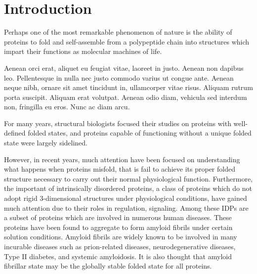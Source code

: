 \chapter{Introduction}

% 

Perhaps one of the most remarkable phenomenon of nature is the ability of proteins to fold and self-assemble from a polypeptide chain into structures which impart their functions as molecular machines of life.


Aenean orci erat, aliquet eu feugiat vitae, laoreet in justo. Aenean non dapibus leo. Pellentesque in nulla nec justo commodo varius ut congue ante. Aenean neque nibh, ornare sit amet tincidunt in, ullamcorper vitae risus. Aliquam rutrum porta suscipit. Aliquam erat volutpat. Aenean odio diam, vehicula sed interdum non, fringilla eu eros. Nunc ac diam arcu.


For many years, structural biologists focused their studies on proteins with well-defined folded states, and proteins capable of functioning without a unique folded state were largely sidelined.

However, in recent years, much attention have been focused on understanding what happens when proteins misfold, that is fail to achieve its proper folded structure necessary to carry out their normal physiological function.  Furthermore, the important of intrinsically disordered proteins, a class of proteins which do not adopt rigid 3-dimensional structures under physiological conditions, have gained much attention due to their roles in regulation, signaling.   Among these IDPs are a subset of proteins which are involved in numerous human diseases.  These proteins have been found to aggregate to form amyloid fibrils under certain solution conditions. Amyloid fibrils are widely known to be involved in many incurable diseases such as prion-related diseases, neurodegenerative diseases, Type II diabetes, and systemic amyloidosis. It is also thought that amyloid fibrillar state may be the globally stable folded state for all proteins.

